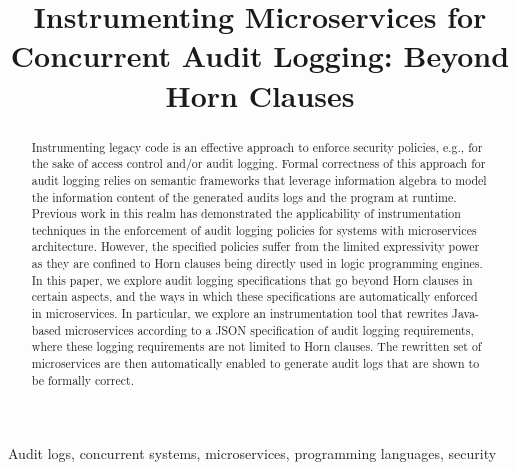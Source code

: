 \title{Instrumenting Microservices for Concurrent Audit Logging: Beyond Horn Clauses}


\author{
\and
{}
}

\maketitle

\begin{abstract}
Instrumenting legacy code is an effective approach to enforce security policies, e.g., for the sake of access control and/or audit logging. Formal correctness of this approach for audit logging relies on semantic frameworks that leverage information algebra to model the information content of the generated audits logs and the program at runtime.  Previous work in this realm has demonstrated the applicability of instrumentation techniques in the enforcement of audit logging policies for systems with microservices architecture. However, the specified policies suffer from the limited expressivity power as they are confined to Horn clauses being directly used in logic programming engines. In this paper, we explore audit logging specifications that go beyond Horn clauses in certain aspects, and the ways in which these specifications are automatically enforced in microservices. In particular, we explore an instrumentation tool that rewrites Java-based microservices according to a JSON specification of audit logging requirements, where these logging requirements are not limited to Horn clauses. The rewritten set of microservices are then automatically enabled to generate audit logs that are shown to be formally correct.
\end{abstract}

\begin{IEEEkeywords}
Audit logs, concurrent systems, microservices, programming languages, security
\end{IEEEkeywords}

